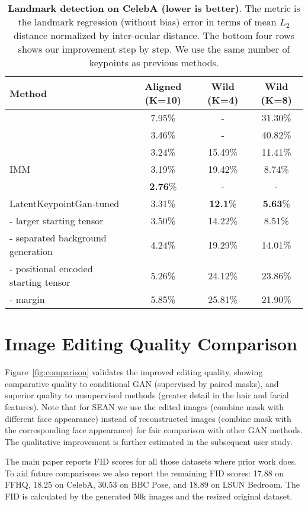 \documentclass[10pt, conference, compsocconf]{IEEEtran}
\begin{document}
\begin{table*}[t]
\centering
\begin{tabular}{|l|c|c|c|}
\hline
Method & Aligned (K=10) & Wild (K=4) & Wild (K=8)  \\ \hline
\cite{thewlis2017unsupervised} & 7.95\% & - & 31.30\% \\ 
\cite{zhang2018unsupervised} & 3.46\% & - & 40.82\% \\ 
\cite{lorenz2019unsupervised} & 3.24\% & 15.49\% & 11.41\% \\
IMM \cite{jakab2018unsupervised} &  3.19\% & 19.42\% & 8.74\% \\
\cite{dundar2020unsupervised} &  \textbf{2.76}\% & - & - \\ \hline
LatentKeypointGan-tuned & 3.31\% & \textbf{12.1}\% & \textbf{5.63}\%\\ 
- larger starting tensor & 3.50\% & 14.22\% & 8.51\% \\
- separated background generation & 4.24\% & 19.29\% & 14.01\% \\
- positional encoded starting tensor & 5.26\% & 24.12\% & 23.86\% \\ 
- margin & 5.85\% & 25.81\% & 21.90\%
\\ \hline
\end{tabular}
\caption{\textbf{Landmark detection on CelebA (lower is better)}. The metric is the landmark regression (without bias) error in terms of mean $L_2$ distance normalized by inter-ocular distance. The bottom four rows shows our improvement step by step. We use the same number of keypoints as previous methods.} 
\label{tab:supp_keypoint_detection}
\end{table*} \section{Image Editing Quality Comparison} \label{sec:supp_quality}
Figure~\ref{fig:comparison} validates the improved editing quality, showing comparative quality to conditional GAN (supervised by paired masks), and superior quality to unsupervised methods (greater detail in the hair and facial features). Note that for SEAN \cite{zhu2020sean} we use the edited images (combine mask with different face appearance) instead of reconstructed images (combine mask with the corresponding face appearance) for fair comparison with other GAN methods. The qualitative improvement is further estimated in the subsequent user study.

The main paper reports FID scores for all those datasets where prior work does. To aid future comparisons we also report the remaining FID scores: 17.88 on FFHQ, 18.25 on CelebA, 30.53 on BBC Pose, and 18.89 on LSUN Bedroom. The FID is calculated by the generated 50k images and the resized original dataset.
\end{document}
